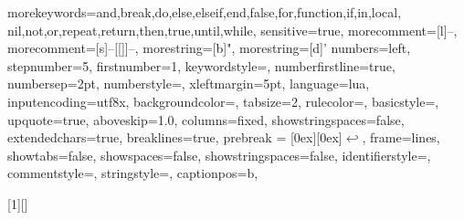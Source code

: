 \usepackage{listings}
\usepackage{textcomp}
  {morekeywords={and,break,do,else,elseif,end,false,for,function,if,in,local,
     nil,not,or,repeat,return,then,true,until,while},
     sensitive=true,
   morecomment=[l]{--},
   morecomment=[s]{--[[}{]]--},
   morestring=[b]",
   morestring=[d]'
  }
{
	numbers=left,
	stepnumber=5,    
	firstnumber=1,
	keywordstyle=\color{blue},
	numberfirstline=true,
	numbersep=2pt, %
	numberstyle=\tiny\color{gray}, %
	xleftmargin=5pt,%
	language=lua,
	inputencoding=utf8x,
	backgroundcolor=\color[rgb]{0.95,0.95,0.95},
	tabsize=2,
	rulecolor=,
	basicstyle=\footnotesize \ttfamily,
	upquote=true,
	aboveskip={1.0\baselineskip},
	columns=fixed,
	showstringspaces=false,
	extendedchars=true,
	breaklines=true,
	prebreak = \raisebox{0ex}[0ex][0ex]{\ensuremath{\hookleftarrow}},
	frame=lines,
	showtabs=false,
	showspaces=false,
	showstringspaces=false,
	identifierstyle=\ttfamily,
	commentstyle=\color[rgb]{0.133,0.545,0.133},
	stringstyle=\color[rgb]{0.627,0.126,0.941},
	captionpos=b,
}  



  
[1][]{ 
	\lstset{ 
		label=#1,
 		style=luastyle}}{}



